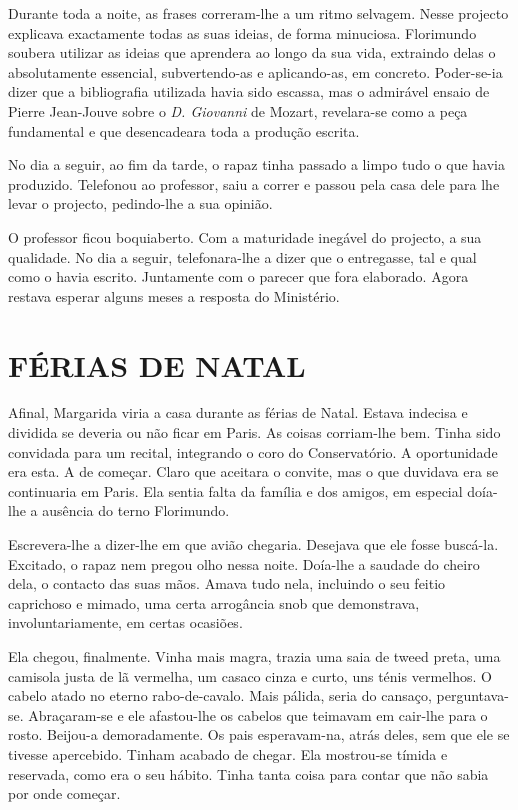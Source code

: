 Durante toda a noite, as frases correram-lhe a um ritmo selvagem. Nesse
projecto explicava exactamente todas as suas ideias, de forma minuciosa.
Florimundo soubera utilizar as ideias que aprendera ao longo da sua
vida, extraindo delas o absolutamente essencial, subvertendo-as e
aplicando-as, em concreto. Poder-se-ia dizer que a bibliografia
utilizada havia sido escassa, mas o admirável ensaio de Pierre
Jean-Jouve sobre o \emph{D. Giovanni} de Mozart, revelara-se como a peça
fundamental e que desencadeara toda a produção escrita.

No dia a seguir, ao fim da tarde, o rapaz tinha passado a limpo tudo o
que havia produzido. Telefonou ao professor, saiu a correr e passou pela
casa dele para lhe levar o projecto, pedindo-lhe a sua opinião.

O professor ficou boquiaberto. Com a maturidade inegável do projecto, a
sua qualidade. No dia a seguir, telefonara-lhe a dizer que o entregasse,
tal e qual como o havia escrito. Juntamente com o parecer que fora
elaborado. Agora restava esperar alguns meses a resposta do Ministério.

\section{FÉRIAS DE NATAL}

Afinal, Margarida viria a casa durante as férias de Natal. Estava
indecisa e dividida se deveria ou não ficar em Paris. As coisas
corriam-lhe bem. Tinha sido convidada para um recital, integrando o coro
do Conservatório. A oportunidade era esta. A de começar. Claro que
aceitara o convite, mas o que duvidava era se continuaria em Paris. Ela
sentia falta da família e dos amigos, em especial doía-lhe a ausência do
terno Florimundo.

Escrevera-lhe a dizer-lhe em que avião chegaria. Desejava que ele fosse
buscá-la. Excitado, o rapaz nem pregou olho nessa noite. Doía-lhe a
saudade do cheiro dela, o contacto das suas mãos. Amava tudo nela,
incluindo o seu feitio caprichoso e mimado, uma certa arrogância snob
que demonstrava, involuntariamente, em certas ocasiões.

Ela chegou, finalmente. Vinha mais magra, trazia uma saia de tweed
preta, uma camisola justa de lã vermelha, um casaco cinza e curto, uns
ténis vermelhos. O cabelo atado no eterno rabo-de-cavalo. Mais pálida,
seria do cansaço, perguntava-se. Abraçaram-se e ele afastou-lhe os
cabelos que teimavam em cair-lhe para o rosto. Beijou-a demoradamente.
Os pais esperavam-na, atrás deles, sem que ele se tivesse apercebido.
Tinham acabado de chegar. Ela mostrou-se tímida e reservada, como era o
seu hábito. Tinha tanta coisa para contar que não sabia por onde
começar.

